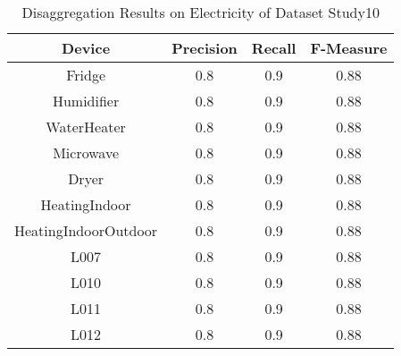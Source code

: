 \begin{table}[!t]
\renewcommand{\arraystretch}{1.3}
\caption{Disaggregation Results on Electricity of Dataset Study10}
\label{table_resultStudy10}
\centering
\begin{tabular}{|c|c|c|c|}
\hline
Device & Precision  & Recall & F-Measure\\
\hline
\hline
Fridge & 0.8 & 0.9 & 0.88\\
\hline
Humidifier & 0.8 & 0.9 & 0.88\\
\hline
WaterHeater & 0.8 & 0.9 & 0.88\\
\hline
Microwave & 0.8 & 0.9 & 0.88\\
\hline
Dryer & 0.8 & 0.9 & 0.88\\
\hline
HeatingIndoor & 0.8 & 0.9 & 0.88\\
\hline
HeatingIndoorOutdoor & 0.8 & 0.9 & 0.88\\
\hline
L007 & 0.8 & 0.9 & 0.88\\
\hline
L010 & 0.8 & 0.9 & 0.88\\
\hline
L011 & 0.8 & 0.9 & 0.88\\
\hline
L012 & 0.8 & 0.9 & 0.88\\
\hline
\end{tabular}
\end{table}